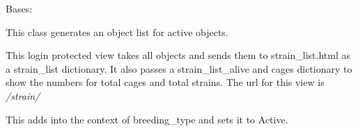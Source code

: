 \documentclass[letterpaper,10pt,english]{sphinxmanual}
\begin{document}
\begin{fulllineitems}
\label{api:mousedb.animal.views.BreedingList}
Bases: {\hyperref[api:mousedb.views.ProtectedListView]{}}

This class generates an object list for active {\hyperref[api:mousedb.animal.models.Breeding]{}} objects.

This login protected view takes all {\hyperref[api:mousedb.animal.models.Breeding]{}} objects and sends them to strain\_list.html as a strain\_list dictionary.  It also passes a strain\_list\_alive and cages dictionary to show the numbers for total cages and total strains.
The url for this view is \emph{/strain/}

\begin{fulllineitems}
\label{api:mousedb.animal.views.BreedingList.context_object_name}
\end{fulllineitems}


\begin{fulllineitems}
\label{api:mousedb.animal.views.BreedingList.get_context_data}
This adds into the context of breeding\_type and sets it to Active.

\end{fulllineitems}



\end{fulllineitems}
\end{document}
